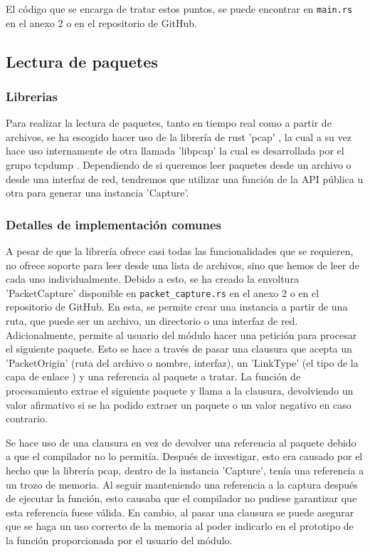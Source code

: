 El código que se encarga de tratar estos puntos, se puede encontrar en \texttt{main.rs} en el anexo 2 o en el repositorio de GitHub.

\subsection{Lectura de paquetes}

\subsubsection{Librerias}

Para realizar la lectura de paquetes, tanto en tiempo real como a partir de archivos, se ha escogido hacer uso de la librería de rust 'pcap' \cite{rustpcap}, la cual a su vez hace uso internamente de otra llamada 'libpcap' la cual es desarrollada por el grupo tcpdump \cite{libpcap}. Dependiendo de si queremos leer paquetes desde un archivo o desde una interfaz de red, tendremos que utilizar una función de la API pública u otra para generar una instancia 'Capture'. 

\subsubsection{Detalles de implementación comunes}

A pesar de que la librería ofrece casi todas las funcionalidades que se requieren, no ofrece soporte para leer desde una lista de archivos, sino que hemos de leer de cada uno individualmente. Debido a esto, se ha creado la envoltura 'PacketCapture' disponible en \texttt{packet\_capture.rs} en el anexo 2 o en el repositorio de GitHub. En esta, se permite crear una instancia a partir de una ruta, que puede ser un archivo, un directorio o una interfaz de red. Adicionalmente, permite al usuario del módulo hacer una petición para procesar el siguiente paquete. Esto se hace a través de pasar una clausura que acepta un 'PacketOrigin' (ruta del archivo o nombre, interfaz), un 'LinkType' (el tipo de la capa de enlace \cite{linktypetcpdump}) y una referencia al paquete a tratar. La función de procesamiento extrae el siguiente paquete y llama a la clausura, devolviendo un valor afirmativo si se ha podido extraer un paquete o un valor negativo en caso contrario.

Se hace uso de una clausura en vez de devolver una referencia al paquete debido a que el compilador no lo permitía. Después de investigar, esto era causado por el hecho que la librería pcap, dentro de la instancia 'Capture', tenía una referencia a un trozo de memoria. Al seguir manteniendo una referencia a la captura después de ejecutar la función, esto causaba que el compilador no pudiese garantizar que esta referencia fuese válida. En cambio, al pasar una clausura se puede asegurar que se haga un uso correcto de la memoria al poder indicarlo en el prototipo de la función proporcionada por el usuario del módulo.

